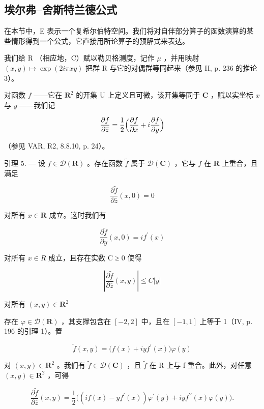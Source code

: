 \subsection{埃尔弗--舍斯特兰德公式}

在本节中，E 表示一个复希尔伯特空间。我们将对自伴部分算子的函数演算的某些情形得到一个公式，它直接用所论算子的预解式来表达。

我们给 R （相应地，C）赋以勒贝格测度，记作 \(\mu\) ，并用映射 \((x,y)\mapsto\exp(2i\pi xy)\) 把群 R 与它的对偶群等同起来（参见 II, p. 236 的推论 3）。

对函数 \(f\) ——它在 \(\mathbf{R}^{2}\) 的开集 U 上定义且可微，该开集等同于 \(\mathbf{C}\) ，赋以实坐标 \(x\) 与 \(y\) ——我们记

\[
{\frac {\partial f}{\partial \overline {{{z}}}}} = {\frac {1}{2}} {\Bigl (} {\frac {\partial f}{\partial x}} + i {\frac {\partial f}{\partial y}} {\Bigr)}
\]

（参见 VAR, R2, 8.8.10, p. 24）。

引理 5. --- 设 \(f \in \mathcal{D}(\mathbf{R})\) 。存在函数 \(\tilde{f}\) 属于 \(\mathcal{D}(\mathbf{C})\) ，它与 \(f\) 在 \(\mathbf{R}\) 上重合，且满足

\[
\frac {\partial \widetilde {f}}{\partial \overline {{z}}} (x, 0) = 0\tag{11}
\]

对所有 \(x \in \mathbf{R}\) 成立。这时我们有

\[
\frac {\partial \widetilde {f}}{\partial y} (x, 0) = i f ^ {\prime} (x)\tag{12}
\]

对所有 \(x \in R\) 成立，且存在实数 C ≥ 0 使得

\[
\left| \frac {\partial \widetilde {f}}{\partial \overline {{z}}} (x, y) \right| \leqslant C | y |\tag{13}
\]

对所有 \((x,y)\in \mathbf{R}^2\)

存在 \(\varphi\in\mathcal{D}(\mathbf{R})\) ，其支撑包含在 \([-2,2]\) 中，且在 \([-1,1]\) 上等于 1（IV, p. 196 的引理 1）。置

\[
\widetilde {f} (x, y) = \bigl (f (x) + i y f ^ {\prime} (x) \bigr) \varphi (y)
\]

对 \((x,y)\in\mathbf{R}^{2}\) 。我们有 \(\widetilde{f}\in\mathcal{D}(\mathbf{C})\) ，且 \(\widetilde{f}\) 在 R 上与 f 重合。此外，对任意 \((x,y)\in\mathbf{R}^{2}\) ，可得

\[
\frac {\partial \widetilde {f}}{\partial \overline {{z}}} (x, y) = \frac {1}{2} \Big ((i f (x) - y f ^ {\prime} (x)) \varphi^ {\prime} (y) + i y f ^ {\prime \prime} (x) \varphi (y) \Big).
\]

